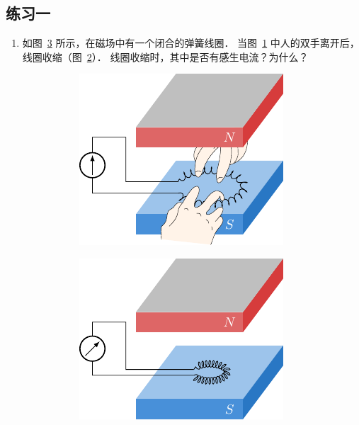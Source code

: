 \subsection*{练习一}
\begin{enumerate}
    \item 如图~\ref{fig_C_2-5} 所示，在磁场中有一个闭合的弹簧线圈．
    当图~\ref{fig_C_2-5a} 中人的双手离开后，线圈收缩（图~\ref{fig_C_2-5b}）．
    线圈收缩时，其中是否有感生电流？为什么？
\begin{figure}[htbp]
    \centering
    \begin{subfigure}{0.4\linewidth}
        \centering
        \includegraphics{fig/C/2-5a.pdf}
        \caption{}\label{fig_C_2-5a}
    \end{subfigure}
    \hfil
    \begin{subfigure}{0.4\linewidth}
        \centering
        \includegraphics{fig/C/2-5b.pdf}
        \caption{}\label{fig_C_2-5b}
    \end{subfigure}
    \caption{}\label{fig_C_2-5}
\end{figure}


\end{enumerate}
